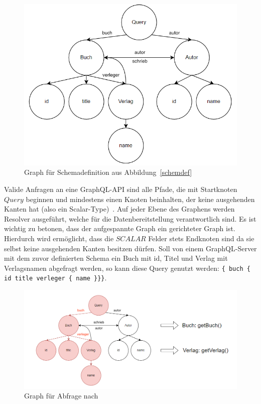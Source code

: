 \begin{figure}[htb]
    \centering
    \includegraphics[width=\textwidth,height=0.4\textheight,keepaspectratio]{img/graph}
    \caption{Graph für Schemadefinition aus Abbildung~\ref{schemdef}}
    \label{schemg}
\end{figure}

Valide Anfragen an eine GraphQL-API sind alle Pfade, die mit Startknoten $Query$ beginnen und mindestens einen Knoten beinhalten,
der keine ausgehenden Kanten hat (also ein Scalar-Type)~\cite[vgl. Modelling with GraphQL]{graphqlgraphtheory}.
Auf jeder Ebene des Graphens werden Resolver ausgeführt, welche für die Datenbereitstellung verantwortlich sind.
Es ist wichtig zu betonen, dass der aufgespannte Graph ein gerichteter Graph ist.
Hierdurch wird ermöglicht, dass die $SCALAR$ Felder stets Endknoten sind da sie selbst keine ausgehenden Kanten besitzen dürfen.
Soll von einem GraphQL-Server mit dem zuvor definierten Schema ein Buch mit id, Titel und Verlag mit Verlagsnamen abgefragt werden,
so kann diese Query genutzt werden: \verb+{ buch { id title verleger { name }}}+.

\begin{figure}[htb]
    \centering
    \includegraphics[width=\textwidth,height=0.4\textheight,keepaspectratio]{img/graphresolver}
    \caption{Graph für Abfrage nach~\cite{graphqlgraphtheory}}
    \label{abfrage}
\end{figure}

